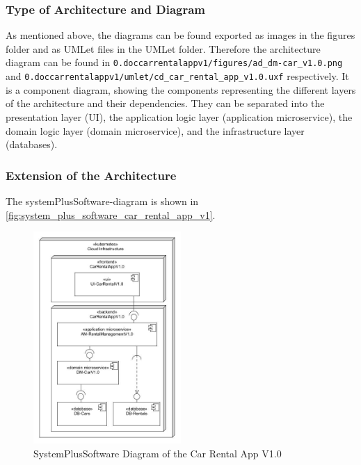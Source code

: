 \subsubsection*{Type of Architecture and Diagram}
As mentioned above, the diagrams can be found exported as images in the figures folder and as UMLet files in the UMLet folder.
Therefore the architecture diagram can be found in \texttt{0.doccarrentalappv1/figures/ad\_dm-car\_v1.0.png} and \hfill \linebreak \texttt{0.doccarrentalappv1/umlet/cd\_car\_rental\_app\_v1.0.uxf} respectively.
It is a component diagram, showing the components representing the different layers of the architecture and their dependencies.
They can be separated into the presentation layer (UI), the application logic layer (application microservice), the domain logic layer (domain microservice), and the infrastructure layer (databases).

\subsubsection*{Extension of the Architecture}
The systemPlusSoftware-diagram is shown in \autoref{fig:system_plus_software_car_rental_app_v1}.

\begin{figure}
    \centering
    \includegraphics[width=0.5\textwidth]{figures/microservices/introduction/ms_dmCar_SPScarRental.png}
    \caption{SystemPlusSoftware Diagram of the Car Rental App V1.0}
    \label{fig:system_plus_software_car_rental_app_v1}
\end{figure}
